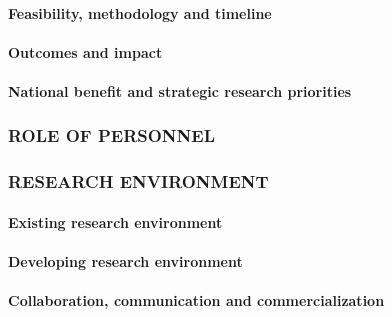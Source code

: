 \documentclass[a4paper]{scrartcl}
\begin{document}





\paragraph{Feasibility, methodology and timeline}


\paragraph{Outcomes and impact}




\paragraph{National benefit and strategic research priorities}



\subsubsection*{ROLE OF PERSONNEL}



\subsubsection*{RESEARCH ENVIRONMENT}

\paragraph{Existing research environment}



\paragraph{Developing research environment}



\paragraph{Collaboration, communication and commercialization}
\end{document}
